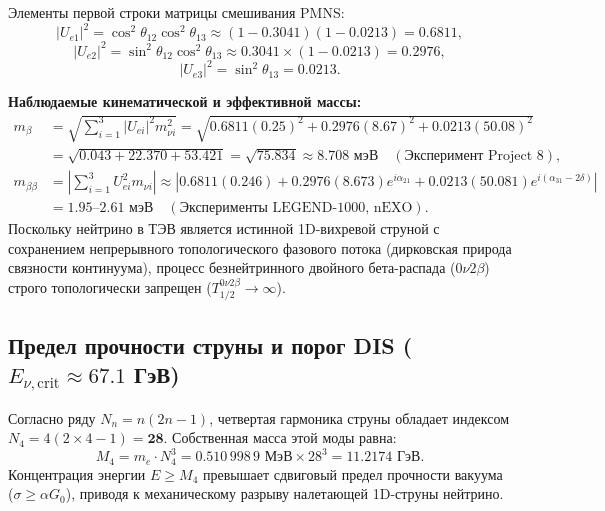 \documentclass[11pt,a4paper]{article}
\theoremstyle{definition}
\theoremstyle{remark}
\begin{document}
Элементы первой строки матрицы смешивания PMNS:
\begin{equation}
	|U_{e1}|^2 = \cos^2\theta_{12} \cos^2\theta_{13} \approx (1 - 0.3041)(1 - 0.0213) = \mathbf{0.6811},
\end{equation}
\begin{equation}
	|U_{e2}|^2 = \sin^2\theta_{12} \cos^2\theta_{13} \approx 0.3041 \times (1 - 0.0213) = \mathbf{0.2976},
\end{equation}
\begin{equation}
	|U_{e3}|^2 = \sin^2\theta_{13} = \mathbf{0.0213}.
\end{equation}

\textbf{Наблюдаемые кинематической и эффективной массы:}
\begin{align}
	m_\beta &= \sqrt{\sum_{i=1}^3 |U_{ei}|^2 m_{\nu i}^2} = \sqrt{0.6811 (0.25)^2 + 0.2976 (8.67)^2 + 0.0213 (50.08)^2} \nonumber \\
	&= \sqrt{0.043 + 22.370 + 53.421} = \sqrt{75.834} \approx \mathbf{8.708 \text{ мэВ}} \quad (\text{Эксперимент Project 8}), \\
	m_{\beta\beta} &= \left| \sum_{i=1}^3 U_{ei}^2 m_{\nu i} \right| \approx \left| 0.6811 (0.246) + 0.2976 (8.673) e^{i\alpha_{21}} + 0.0213 (50.081) e^{i(\alpha_{31} - 2\delta)} \right| \nonumber \\
	&= \mathbf{1.95 \text{--} 2.61 \text{ мэВ}} \quad (\text{Эксперименты LEGEND-1000, nEXO}).
\end{align}
Поскольку нейтрино в ТЭВ является истинной 1D-вихревой струной с сохранением непрерывного топологического фазового потока (дирковская природа связности континуума), процесс безнейтринного двойного бета-распада ($0\nu 2\beta$) строго топологически запрещен ($T_{1/2}^{0\nu 2\beta} \to \infty$).

\subsection{Предел прочности струны и порог DIS ($E_{\nu, \text{crit}} \approx 67.1$ ГэВ)}
Согласно ряду $N_n = n(2n-1)$, четвертая гармоника струны обладает индексом $N_4 = 4(2 \times 4 - 1) = \mathbf{28}$. Собственная масса этой моды равна:
\begin{equation}
	M_4 = m_e \cdot N_4^3 = 0.510\,998\,9 \text{ МэВ} \times 28^3 = \mathbf{11.2174 \text{ ГэВ}}.
\end{equation}
Концентрация энергии $E \ge M_4$ превышает сдвиговый предел прочности вакуума ($\sigma \ge \alpha G_0$), приводя к механическому разрыву налетающей 1D-струны нейтрино. 
\end{document}
